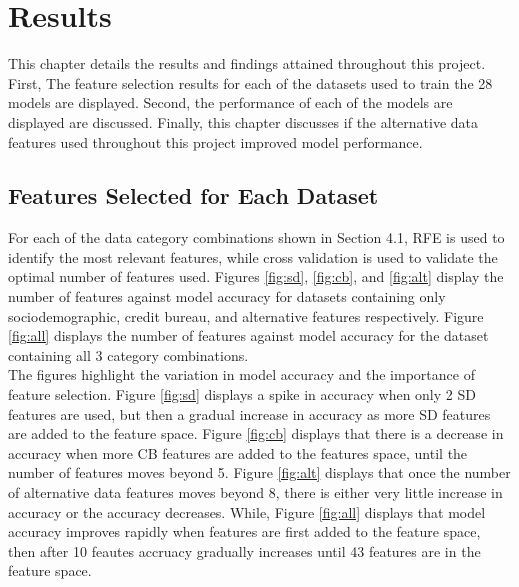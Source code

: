 \chapter{Results} 
\label{Chapter5}

This chapter details the results and findings attained throughout this project. First, The feature selection results for each of the datasets used to train the 28 models are displayed. Second, the performance of each of the models are displayed are discussed. Finally, this chapter discusses if the alternative data features used throughout this project improved model performance.  


\section{Features Selected for Each Dataset}

For each of the data category combinations shown in Section 4.1, RFE is used to identify the most relevant features, while cross validation is used to validate the optimal number of features used. Figures \ref{fig:sd}, \ref{fig:cb}, and \ref{fig:alt} display the number of features against model accuracy for datasets containing only sociodemographic, credit bureau, and alternative features respectively. Figure \ref{fig:all} displays the number of features against model accuracy for the dataset containing all 3 category combinations. \\


The figures highlight the variation in model accuracy and the importance of feature selection. Figure \ref{fig:sd} displays a spike in accuracy when only 2 SD features are used, but then a gradual increase in accuracy as more SD features are added to the feature space. Figure \ref{fig:cb} displays that there is a decrease in accuracy when more CB features are added to the features space, until the number of features moves beyond 5. Figure \ref{fig:alt} displays that once the number of alternative data features moves beyond 8, there is either very little increase in accuracy or the accuracy decreases. While, Figure \ref{fig:all} displays that model accuracy improves rapidly when features are first added to the feature space, then after 10 feautes accruacy gradually increases until 43 features are in the feature space. 


\vspace{10 pt}

